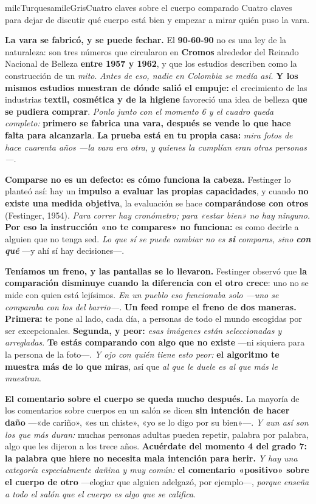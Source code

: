 \documentclass[11pt,letterpaper]{article}
\newcommand{\milcpaso}[3]{%
\Needspace{4\baselineskip}%
\begin{tcolorbox}[enhanced,colback=white,colframe=milcLinea,arc=1.5mm,boxrule=.9pt,
  left=14mm,right=4mm,top=3mm,bottom=3mm,before skip=4pt,after skip=4pt,
  fontupper=\RaggedRight,
  overlay={\node[anchor=north west,circle,fill=#2,text=white,inner sep=0pt,
    minimum size=7.4mm,font=\sffamily\bfseries\small]
    at ([xshift=3.6mm,yshift=-3.2mm]frame.north west) {#1};}]
#3
\end{tcolorbox}}
\begin{document}
\begin{softbox}{milcTurquesa}{milcGris}{Cuatro claves sobre el cuerpo comparado}
Cuatro claves para dejar de discutir qué cuerpo está bien y empezar a mirar quién puso la vara.
\end{softbox}

\milcpaso{1}{milcTurquesa}{\textbf{La vara se fabricó, y se puede fechar.} El \textbf{90-60-90} no es una ley de la naturaleza: son tres números que circularon en \textbf{Cromos} alrededor del Reinado Nacional de Belleza \textbf{entre 1957 y 1962}, y que los estudios describen como la construcción de un \emph{mito}. \emph{Antes de eso, nadie en Colombia se medía así.} \textbf{Y los mismos estudios muestran de dónde salió el empuje:} el crecimiento de las industrias \textbf{textil, cosmética y de la higiene} favoreció una idea de belleza \textbf{que se pudiera comprar}. \emph{Ponlo junto con el momento 6 y el cuadro queda completo:} \textbf{primero se fabrica una vara, después se vende lo que hace falta para alcanzarla}. \textbf{La prueba está en tu propia casa:} \emph{mira fotos de hace cuarenta años ---la vara era otra, y quienes la cumplían eran otras personas---.}}
\milcpaso{2}{milcTurquesa}{\textbf{Comparse no es un defecto: es cómo funciona la cabeza.} Festinger lo planteó así: hay un \textbf{impulso a evaluar las propias capacidades}, y cuando \textbf{no existe una medida objetiva}, la evaluación se hace \textbf{comparándose con otros} (Festinger, 1954). \emph{Para correr hay cronómetro; para «estar bien» no hay ninguno.} \textbf{Por eso la instrucción «no te compares» no funciona:} es como decirle a alguien que no tenga sed. \emph{Lo que sí se puede cambiar no es \textbf{si} comparas, sino \textbf{con qué}} ---y ahí sí hay decisiones---.}
\milcpaso{3}{milcTurquesa}{\textbf{Teníamos un freno, y las pantallas se lo llevaron.} Festinger observó que \textbf{la comparación disminuye cuando la diferencia con el otro crece}: uno no se mide con quien está lejísimos. \emph{En un pueblo eso funcionaba solo ---uno se comparaba con los del barrio---.} \textbf{Un feed rompe el freno de dos maneras.} \textbf{Primera:} te pone al lado, cada día, a personas de todo el mundo escogidas por ser excepcionales. \textbf{Segunda, y peor:} \emph{esas imágenes están seleccionadas y arregladas}. \textbf{Te estás comparando con algo que no existe} ---ni siquiera para la persona de la foto---. \emph{Y ojo con quién tiene esto peor:} \textbf{el algoritmo te muestra más de lo que miras}, así que \emph{al que le duele es al que más le muestran}.}
\milcpaso{4}{milcTurquesa}{\textbf{El comentario sobre el cuerpo se queda mucho después.} La mayoría de los comentarios sobre cuerpos en un salón se dicen \textbf{sin intención de hacer daño} ---«de cariño», «es un chiste», «yo se lo digo por su bien»---. \emph{Y aun así son los que más duran:} muchas personas adultas pueden repetir, palabra por palabra, algo que les dijeron a los trece años. \textbf{Acuérdate del momento 4 del grado 7: la palabra que hiere no necesita mala intención para herir.} \emph{Y hay una categoría especialmente dañina y muy común:} \textbf{el comentario «positivo» sobre el cuerpo de otro} ---elogiar que alguien adelgazó, por ejemplo---, \emph{porque enseña a todo el salón que el cuerpo es algo que se califica}.}
\end{document}
